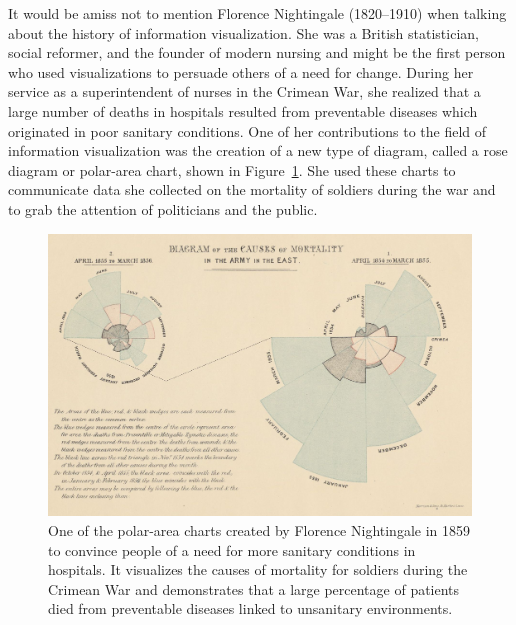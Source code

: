 It would be amiss not to mention Florence Nightingale (1820--1910)
\parencite{FlorenceNightingale, NightingaleBook} when talking about
the history of information visualization. She was a British
statistician, social reformer, and the founder of modern nursing and
might be the first person who used visualizations to persuade others
of a need for change. During her service as a superintendent of nurses
in the Crimean War, she realized that a large number of deaths in
hospitals resulted from preventable diseases which originated in poor
sanitary conditions. One of her contributions to the field of
information visualization was the creation of a new type of diagram,
called a rose diagram or polar-area chart, shown in
Figure~\ref{fig:NightingalePolarAreaChart}. She used these charts to
communicate data she collected on the mortality of soldiers during the
war and to grab the attention of politicians and the public.

\begin{figure}[tp]
\centering
\includegraphics[keepaspectratio,width=\linewidth,height=\thirdh]
{images/nightingale.jpg}
\caption[Polar-Area Chart by Florence Nightingale from 1859]{%
One of the polar-area charts created by Florence Nightingale in 1859
to convince people of a need for more sanitary conditions in
hospitals. It visualizes the causes of mortality for soldiers during
the Crimean War and demonstrates that a large percentage of patients
died from preventable diseases linked to unsanitary environments.
}
\label{fig:NightingalePolarAreaChart}
\end{figure}




